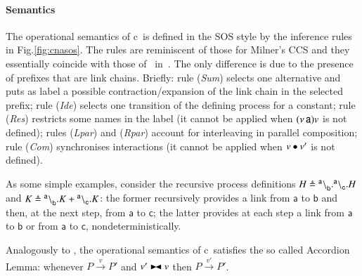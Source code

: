 \paragraph{Semantics}

The operational semantics of c\CNA\ is defined in the SOS style by the inference rules in Fig.\ref{fig:cnasos}. The rules are reminiscent of those for Milner's CCS and they essentially coincide with those of \CNA\ in~\cite{BBB17}. The only difference is due to the presence of prefixes that are link chains.
Briefly: rule (\textit{Sum}) selects one alternative and puts as label a possible contraction/expansion of the link chain in the selected prefix; rule (\textit{Ide}) selects one transition of the defining process for a constant; rule (\textit{Res}) restricts some names in the label (it cannot be applied when $(\nu\, \mathsf{a})v$ is not defined); rules (\textit{Lpar}) and (\textit{Rpar}) account for interleaving in parallel composition; rule (\textit{Com}) 
synchronises interactions (it cannot be applied when $v \bullet v'$ is not defined).

\begin{example}
As some simple examples, consider the recursive process definitions $H \triangleq {}^{\mathsf{a}} \backslash_{\mathsf{b}}^{}.{}^{\mathsf{a}} \backslash_{\mathsf{c}}^{}.H$ and $K \triangleq {}^{\mathsf{a}} \backslash_{\mathsf{b}}^{}.K + {}^{\mathsf{a}} \backslash_{\mathsf{c}}^{}.K$: the former recursively provides a link from $\mathsf{a}$ to $\mathsf{b}$ and then, at the next step, from $\mathsf{a}$ to $\mathsf{c}$; the latter provides at each step a link from $\mathsf{a}$ to $\mathsf{b}$ or from $\mathsf{a}$ to $\mathsf{c}$, nondeterministically. 
\end{example}

Analogously to \CNA, the operational semantics of c\CNA\ satisfies the so called Accordion Lemma: whenever $P \xrightarrow{v} P'$ and $v'\blackstretcheq v$ then $P \xrightarrow{v'} P'$.


